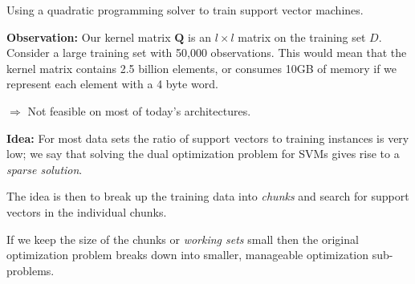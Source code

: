 \documentclass[a4paper,blends,pdf,colorBG,slideColor]{prosper}
\begin{document}
\es

\begin{center}
Using a quadratic programming solver to train support vector machines.
\end{center}
\es

\vspace{.2in}
{\bf Observation:} Our kernel matrix $\mathbf Q$ is an $l\times l$ matrix on the training set $D$.
Consider a large training set with 50,000 observations.  This would mean that the kernel
matrix contains 2.5 billion elements, or consumes 10GB of memory if we represent each element with a 4 byte word.

$\Rightarrow$ Not feasible on most of today's architectures.
\es

\vspace{.2in}
{\bf Idea:} For most data sets the ratio of support vectors to training instances is very low; we say
that solving the dual optimization problem for SVMs gives rise to a {\em sparse solution}.

The idea is then to break up the training data into {\em chunks} and search for support vectors in
the individual chunks.

If we keep the size of the chunks or {\em working sets} small then the original optimization
problem breaks down into smaller, manageable optimization sub-problems.
\es
\end{document}
